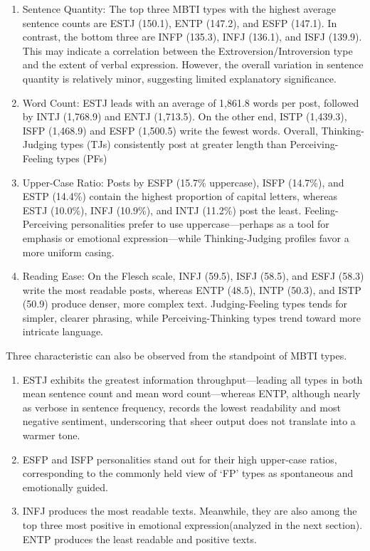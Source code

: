 \documentclass[12pt]{article}
\begin{document}
	\begin{enumerate}
	\item Sentence Quantity: The top three MBTI types with the highest average sentence counts are ESTJ (150.1), ENTP (147.2), and ESFP (147.1). In contrast, the bottom three are INFP (135.3), INFJ (136.1), and ISFJ (139.9). This may indicate a correlation between the Extroversion/Introversion type and the extent of verbal expression. However, the overall variation in sentence quantity is relatively minor, suggesting limited explanatory significance.
	\item Word Count: ESTJ leads with an average of 1,861.8 words per post, followed by INTJ (1,768.9) and ENTJ (1,713.5). On the other end, ISTP (1,439.3), ISFP (1,468.9) and ESFP (1,500.5) write the fewest words. Overall, Thinking-Judging types (TJs) consistently post at greater length than Perceiving-Feeling types (PFs)
	\item Upper-Case Ratio:  Posts by ESFP (15.7\% uppercase), ISFP (14.7\%), and ESTP (14.4\%) contain the highest proportion of capital letters, whereas ESTJ (10.0\%), INFJ (10.9\%), and INTJ (11.2\%) post the least. Feeling-Perceiving personalities prefer to use uppercase—perhaps as a tool for emphasis or emotional expression—while Thinking-Judging profiles favor a more uniform casing. 
	\item Reading Ease: On the Flesch scale, INFJ (59.5), ISFJ (58.5), and ESFJ (58.3) write the most readable posts, whereas ENTP (48.5), INTP (50.3), and ISTP (50.9) produce denser, more complex text. Judging-Feeling types tends for simpler, clearer phrasing, while Perceiving-Thinking types trend toward more intricate language.
	\end{enumerate}
	
	Three characteristic can also be observed from the standpoint of MBTI types.
	\begin{enumerate}
	\item ESTJ exhibits the greatest information throughput—leading all types in both mean sentence count and mean word count—whereas ENTP, although nearly as verbose in sentence frequency, records the lowest readability and most negative sentiment, underscoring that sheer output does not translate into a warmer tone.
	\item ESFP and ISFP personalities stand out for their high upper-case ratios, corresponding to the commonly held view of ‘FP’ types as spontaneous and emotionally guided.
	\item INFJ produces the most readable texts. Meanwhile, they are also among the top three most positive in emotional expression(analyzed in the next section). ENTP produces the least readable and positive texts.

	\end{enumerate}
	 
\end{document}
